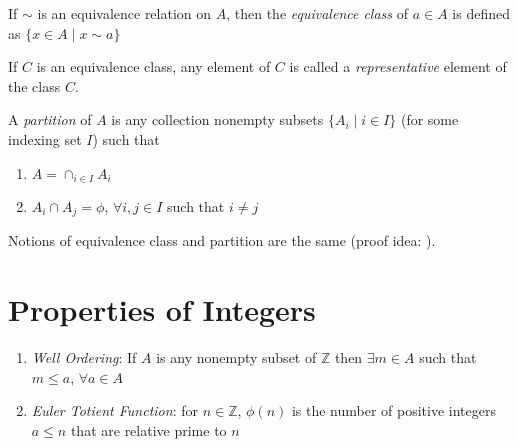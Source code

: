 \documentclass[titlepage, 12pt]{article}
\begin{document}
If $\sim$ is an equivalence relation on $A$, then the \textit{equivalence class}
of $a\in A$ is defined as $\{x\in A\mid x\sim a\}$

If $C$ is an equivalence class, any element of $C$ is called a
\textit{representative} element of the class $C$.

A \textit{partition} of $A$ is any collection nonempty subsets $\{A_i\mid i\in
I\}$ (for some indexing set $I$) such that

	\begin{enumerate}

		\item $A = \cap_{i\in I} A_i$

		\item $A_i\cap A_j = \phi$, $\forall i, j\in I$ such that $i\neq j$

	\end{enumerate}

	Notions of equivalence class and partition are the same (proof idea: ).

	\section{Properties of Integers}

	\begin{enumerate}

		\item\textit{Well Ordering}: If $A$ is any nonempty subset of
			$\mathbb{Z}$ then $\exists m\in A$ such that $m\le a$, $\forall a\in
			A$

		\item\textit{Euler Totient Function}: for $n\in\mathbb{Z}$, $\phi(n)$ is
			the number of positive integers $a\le n$ that are relative prime to
			$n$

	\end{enumerate}
\end{document}
